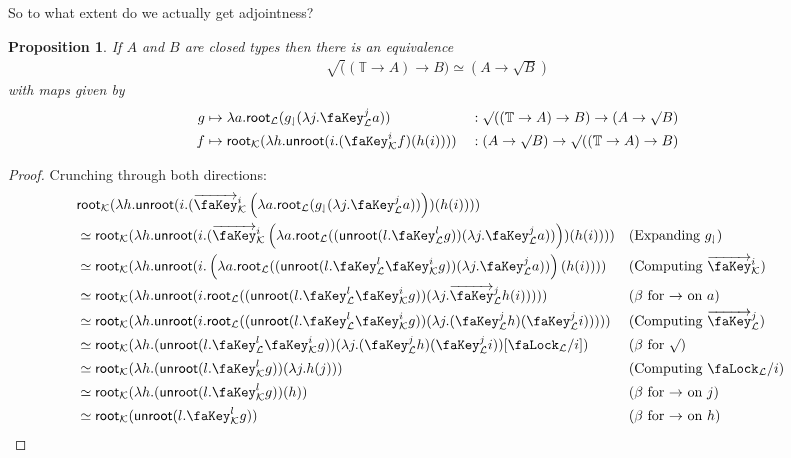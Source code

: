 \documentclass[10pt]{article}
\newtheorem{proposition}[theorem]{Proposition}
\theoremstyle{definition}
\let\oldequiv\equiv%
\renewcommand{\equiv}{\simeq}
\newcommand{\defeq}{\oldequiv}
\newcommand{\lock}{\text{\faLock}}
\newcommand{\key}{\text{\faKey}}
\newcommand{\Tiny}{\mathbb{T}}
\newcommand{\lockn}[1]{\mathcal{#1}}
\newcommand{\varkey}[2]{\key_{\lockn{#1}}^{#2}}
\newcommand{\admkey}[2]{\overrightarrow{\key}_{\lockn{#1}}^{#2}}
\newcommand{\locksub}[2]{\lock_{\lockn{#1}}/#2}
\newcommand{\rformu}[1]{\surd #1}
\newcommand{\rintro}[2]{\mathsf{root}_{\lockn{#1}}(#2)}
\newcommand{\relim}[1]{\mathsf{unroot}(#1)}
\newcommand{\rget}[1]{#1_{\downharpoonleft}}
\begin{document}
So to what extent do we actually get adjointness?
\begin{proposition}
If $A$ and $B$ are closed types then there is an equivalence
\begin{align*}
\rformu ((\Tiny \to A) \to B) \equiv (A \to \rformu B)
\end{align*}
with maps given by
\begin{alignat*}{2}
g &\mapsto \lambda a. \rintro{L}{\rget{g}(\lambda j.\varkey{L}{j} a)} &&: \rformu((\Tiny \to A) \to B) \to (A \to \rformu B) \\
f &\mapsto \rintro{K}{\lambda h. \relim{i.(\varkey{K}{i} f)(h(i))}} &&: (A \to \rformu B) \to \rformu ((\Tiny \to A) \to B)
\end{alignat*}
\end{proposition}
\begin{proof}
Crunching through both directions:
\begin{align*}
&\rintro{K}{\lambda h. \relim{i.(\admkey{K}{i} \left(\lambda a. \rintro{L}{\rget{g}(\lambda j.\varkey{L}{j} a)}\right))(h(i))}} \\
&\defeq \rintro{K}{\lambda h. \relim{i.(\admkey{K}{i} \left(\lambda a. \rintro{L}{(\relim{l.\varkey{L}{l} g})(\lambda j.\varkey{L}{j} a)}\right))(h(i))}} && \text{(Expanding $\rget g$)} \\
&\defeq \rintro{K}{\lambda h. \relim{i.\left(\lambda a. \rintro{L}{(\relim{l.\varkey{L}{l} \varkey{K}{i} g})(\lambda j.\varkey{L}{j} a)}\right)(h(i))}} && \text{(Computing $\admkey{K}{i}$)} \\
&\defeq \rintro{K}{\lambda h. \relim{i.\rintro{L}{(\relim{l.\varkey{L}{l} \varkey{K}{i} g})(\lambda j.\admkey{L}{j} h(i))}}} && \text{($\beta$ for $\to$ on $a$)} \\
&\defeq \rintro{K}{\lambda h. \relim{i.\rintro{L}{(\relim{l.\varkey{L}{l} \varkey{K}{i} g})(\lambda j.(\varkey{L}{j} h)(\varkey{L}{j} i))}}} && \text{(Computing $\admkey{L}{j}$)} \\
&\defeq \rintro{K}{\lambda h. (\relim{l.\varkey{L}{l} \varkey{K}{i} g})(\lambda j.(\varkey{L}{j} h)(\varkey{L}{j} i))[\locksub{L}{i}]} && \text{($\beta$ for $\rformu$)} \\
&\defeq \rintro{K}{\lambda h. (\relim{l.\varkey{K}{l} g})(\lambda j.h( j))} && \text{(Computing $\locksub{L}{i}$)} \\
&\defeq \rintro{K}{\lambda h. (\relim{l.\varkey{K}{l} g})(h)} && \text{($\beta$ for $\to$ on $j$)} \\
&\defeq \rintro{K}{\relim{l.\varkey{K}{l} g}} && \text{($\beta$ for $\to$ on $h$)} \\

\end{align*}
\end{proof}
\end{document}
